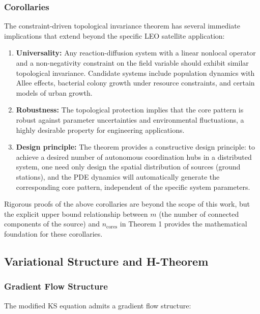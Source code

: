 \documentclass[sn-nature,pdflatex]{sn-jnl}
\begin{document}
\subsubsection{Corollaries}

The constraint-driven topological invariance theorem has several immediate implications that extend beyond the specific LEO satellite application:

\begin{enumerate}
  \item \textbf{Universality:} Any reaction-diffusion system with a linear nonlocal operator and a non-negativity constraint on the field variable should exhibit similar topological invariance. Candidate systems include population dynamics with Allee effects, bacterial colony growth under resource constraints, and certain models of urban growth.
  \item \textbf{Robustness:} The topological protection implies that the core pattern is robust against parameter uncertainties and environmental fluctuations, a highly desirable property for engineering applications.
  \item \textbf{Design principle:} The theorem provides a constructive design principle: to achieve a desired number of autonomous coordination hubs in a distributed system, one need only design the spatial distribution of sources (ground stations), and the PDE dynamics will automatically generate the corresponding core pattern, independent of the specific system parameters.
\end{enumerate}

Rigorous proofs of the above corollaries are beyond the scope of this work, but the explicit upper bound relationship between $m$ (the number of connected components of the source) and $n_{\text{cores}}$ in Theorem 1 provides the mathematical foundation for these corollaries.

\subsection{Variational Structure and H-Theorem}
\label{sec:variational}

\subsubsection{Gradient Flow Structure}

The modified KS equation admits a gradient flow structure:
\end{document}
